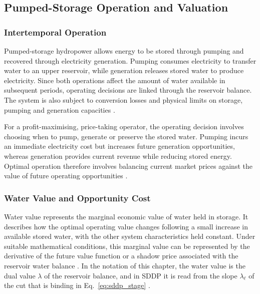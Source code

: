 \subsection{Pumped-Storage Operation and Valuation}
\label{subsec:pumped_storage_valuation}

\subsubsection{Intertemporal Operation}

Pumped-storage hydropower allows energy to be stored through pumping and recovered through electricity generation. Pumping consumes electricity to transfer water to an upper reservoir, while generation releases stored water to produce electricity. Since both operations affect the amount of water available in subsequent periods, operating decisions are linked through the reservoir balance. The system is also subject to conversion losses and physical limits on storage, pumping and generation capacities \parencite{blakers2021,chazarra2017}.

For a profit-maximising, price-taking operator, the operating decision involves choosing when to pump, generate or preserve the stored water. Pumping incurs an immediate electricity cost but increases future generation opportunities, whereas generation provides current revenue while reducing stored energy. Optimal operation therefore involves balancing current market prices against the value of future operating opportunities \parencite{horsleyWrobel2002,tilmant2008}.

\subsubsection{Water Value and Opportunity Cost}
\label{subsec:water_value}

Water value represents the marginal economic value of water held in storage. It describes how the optimal operating value changes following a small increase in available stored water, with the other system characteristics held constant. Under suitable mathematical conditions, this marginal value can be represented by the derivative of the future value function or a shadow price associated with the reservoir water balance \parencite{tilmant2008,horsleyWrobel2002}. %
In the notation of this chapter, the water value is the dual value $\lambda$ of the reservoir balance, and in SDDP it is read from the slope $\lambda_\ell$ of the cut that is binding in Eq.~\eqref{eq:sddp_stage} \parencite{helseth2016}.

